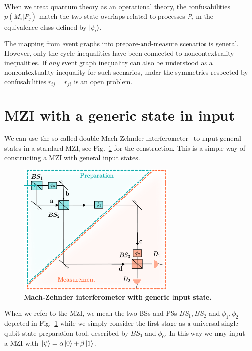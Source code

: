 \documentclass[a4paper,twocolumn,11pt,accepted=2024-01-17]{quantumarticle}
\begin{document}
When we treat quantum theory as an operational theory, the confusabilities $p(M_i \vert P_j)$ match the two-state overlaps related to processes $P_i$ in the equivalence class defined by $\vert \phi_i \rangle$. 

The mapping from event graphs into prepare-and-measure scenarios is general. However, only the cycle-inequalities have been connected to noncontextuality inequalities. If \textit{any} event graph inequality can also be understood as a noncontextuality inequality for such scenarios, under the symmetries respected by confusabilities $r_{ij} = r_{ji}$ is an open problem.



\section{MZI with a generic state in input}

We can use the so-called double Mach-Zehnder interferometer~\cite{chrysosthemos_quantum_2022} to input general states in a standard MZI, see Fig.~\ref{fig:doubleMZI} for the construction. This is a simple way of constructing a MZI with general input states. 

\begin{figure}[H]
    \centering
    \includegraphics[width=0.7\textwidth]{Acc_Figures/FinaldoubleMZI.png}
    \caption{\textbf{Mach-Zehnder interferometer with generic input state.}}
    \label{fig:doubleMZI}
\end{figure}

When we refer to the MZI, we mean the two BSs and PSs $BS_1,BS_2$ and $\phi_1,\phi_2$ depicted in Fig.~\ref{fig:doubleMZI} while we simply consider the first stage as a universal single-qubit state preparation tool, described by $BS_1$ and $\phi_0$. In this way we may input a MZI with  $\ket{\psi}=\alpha\ket{0}+\beta\ket{1}$.
\end{document}
